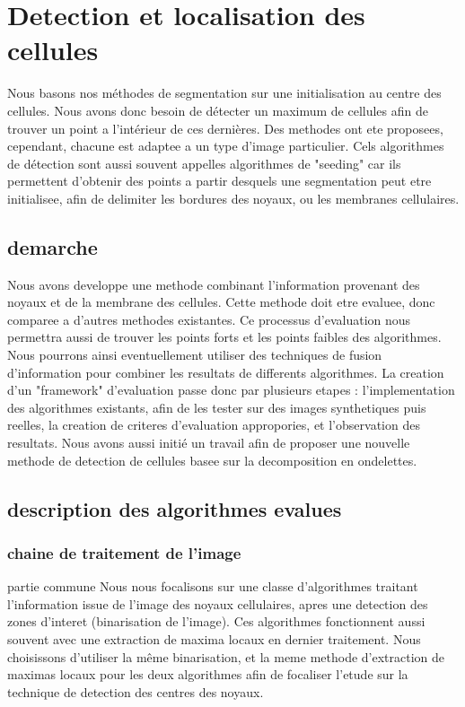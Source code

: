 \section{Detection et localisation des cellules}

Nous basons nos méthodes de segmentation sur une initialisation au centre des cellules. Nous avons donc besoin de détecter un maximum de cellules afin de trouver un point a l'intérieur de ces dernières. Des methodes ont ete proposees, cependant, chacune est adaptee a un type d'image particulier.
Cels algorithmes de détection sont aussi souvent appelles algorithmes de "seeding" car ils permettent d'obtenir des points a partir desquels une segmentation peut etre initialisee, afin de delimiter les bordures des noyaux, ou les membranes cellulaires.

\subsection{demarche}

Nous avons developpe une methode combinant l'information provenant des noyaux et de la membrane des cellules. Cette methode doit etre evaluee, donc comparee a d'autres methodes existantes. Ce processus d'evaluation nous permettra aussi de trouver les points forts et les points faibles des algorithmes. Nous pourrons ainsi eventuellement utiliser des techniques de fusion d'information pour combiner les resultats de differents algorithmes.
La creation d'un "framework" d'evaluation passe donc par plusieurs etapes : l'implementation des algorithmes existants, afin de les tester sur des images synthetiques puis reelles, la creation de criteres d'evaluation appropories, et l'observation des resultats. Nous avons aussi initié un travail afin de proposer une nouvelle methode de detection de cellules basee sur la decomposition en ondelettes.


\subsection {description des algorithmes evalues}



\subsubsection{chaine de traitement de l'image}

partie commune
Nous nous focalisons sur une classe d'algorithmes traitant l'information issue de l'image des noyaux cellulaires, apres une detection des zones d'interet (binarisation de l'image). Ces algorithmes fonctionnent aussi souvent avec une extraction de maxima locaux en dernier traitement.
Nous choisissons d'utiliser la même binarisation, et la meme methode d'extraction de maximas locaux pour les deux algorithmes afin de focaliser l'etude sur la technique de detection des centres des noyaux.

